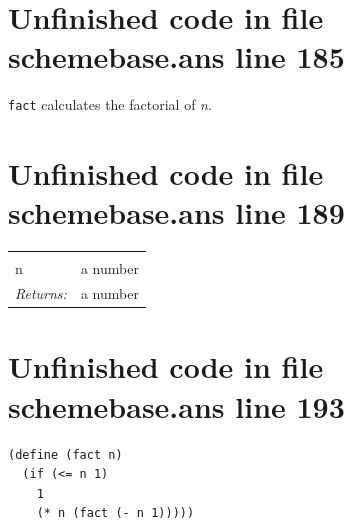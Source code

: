 \documentclass[twoside,9pt]{report}
\begin{document}
\section{Unfinished code in file schemebase.ans line 185}


\texttt{fact} calculates the factorial of \emph{n}.

\section{Unfinished code in file schemebase.ans line 189}
\noindent\begin{tabular}{ |p{1.9cm} p{8cm}| }
\hline
\rowcolor[HTML]{CCCCCC} \multicolumn{2}{|l|}{\bf fact (public)} \\
n & a number \\
\textit{Returns:} & a number \\
\hline
\end{tabular}
\section{Unfinished code in file schemebase.ans line 193}
\begin{lstlisting}
(define (fact n)
  (if (<= n 1)
    1
    (* n (fact (- n 1)))))
\end{lstlisting}

\printindex
\end{document}
